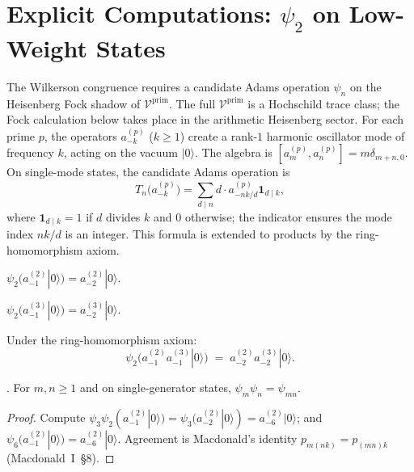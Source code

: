 \section{Explicit Computations: \(\psi_{2}\) on Low-Weight States}
\label{v4-arith:gb:explicit-psi-2}

The Wilkerson congruence requires a candidate Adams operation \(\psi_{n}\)
on the Heisenberg Fock shadow of \(\mathcal{V}^{\mathrm{prim}}\). The full
\(\mathcal{V}^{\mathrm{prim}}\) is a Hochschild trace class; the Fock
calculation below takes place in the arithmetic Heisenberg sector. For
each prime \(p\), the operators
\(a^{(p)}_{-k}\) (\(k\geq 1\)) create a rank-\(1\) harmonic oscillator mode
of frequency \(k\), acting on the vacuum \(|0\rangle\). The algebra is
\([a^{(p)}_m, a^{(p)}_n]=m\delta_{m+n,0}\). On single-mode states, the
candidate Adams operation is
\begin{equation}
\label{v4-arith:eq:Tn-formula}
T_{n}\bigl(a^{(p)}_{-k}\bigr)=\sum_{d\mid n}d\cdot a^{(p)}_{-nk/d}\mathbf{1}_{d\mid k},
\end{equation}
where \(\mathbf{1}_{d\mid k}=1\) if \(d\) divides \(k\) and \(0\) otherwise;
the indicator ensures the mode index \(nk/d\) is an integer. This formula is
extended to products by the ring-homomorphism axiom.

\begin{computation}
\label{v4-arith:comp:psi2-a2}
\(\psi_{2}(a^{(2)}_{-1}|0\rangle)=a^{(2)}_{-2}|0\rangle\).
\end{computation}

\begin{computation}
\label{v4-arith:comp:psi2-a3}
\(\psi_{2}(a^{(3)}_{-1}|0\rangle)=a^{(3)}_{-2}|0\rangle\).
\end{computation}

\begin{computation}
\label{v4-arith:comp:psi2-a2a3}
Under the ring-homomorphism axiom:
\begin{equation}
\psi_{2}(a^{(2)}_{-1}a^{(3)}_{-1}|0\rangle)
\;=\;a^{(2)}_{-2}a^{(3)}_{-2}|0\rangle.
\end{equation}
\end{computation}

\begin{lemma}
\label{v4-arith:lem:composition-law}
\ClaimStatusProvedHere. For \(m,n\geq 1\) and on single-generator
states, \(\psi_{m}\psi_{n}=\psi_{mn}\).
\end{lemma}

\begin{proof}
Compute \(\psi_{3}\psi_{2}(a^{(2)}_{-1}|0\rangle)=\psi_{3}(a^{(2)}_{-2}|0\rangle)=a^{(2)}_{-6}|0\rangle\);
and \(\psi_{6}(a^{(2)}_{-1}|0\rangle)=a^{(2)}_{-6}|0\rangle\).
Agreement is Macdonald's identity
\(p_{m(nk)}=p_{(mn)k}\) (Macdonald~I~\S8).
\end{proof}


